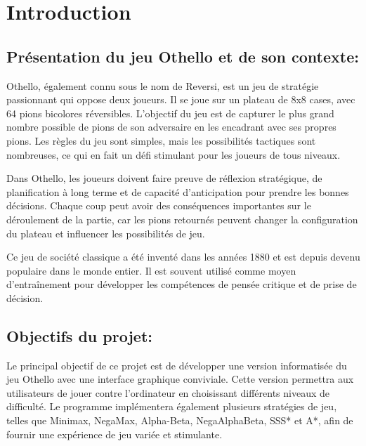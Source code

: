 \documentclass[12pt]{article}
\begin{document}
 
	\thispagestyle{empty}
	
	
	
	\newpage
	\tableofcontents
	\newpage
	\listoffigures
	\newpage
	\printglossary[title={Liste des Abbréviations}] %
	\newpage
	\section{Introduction}
	\subsection{Présentation du jeu Othello et de son contexte:}



Othello, également connu sous le nom de Reversi, est un jeu de stratégie passionnant qui oppose deux joueurs. Il se joue sur un plateau de 8x8 cases, avec 64 pions bicolores réversibles. L'objectif du jeu est de capturer le plus grand nombre possible de pions de son adversaire en les encadrant avec ses propres pions. Les règles du jeu sont simples, mais les possibilités tactiques sont nombreuses, ce qui en fait un défi stimulant pour les joueurs de tous niveaux.

Dans Othello, les joueurs doivent faire preuve de réflexion stratégique, de planification à long terme et de capacité d'anticipation pour prendre les bonnes décisions. Chaque coup peut avoir des conséquences importantes sur le déroulement de la partie, car les pions retournés peuvent changer la configuration du plateau et influencer les possibilités de jeu.

Ce jeu de société classique a été inventé dans les années 1880 et est depuis devenu populaire dans le monde entier. Il est souvent utilisé comme moyen d'entraînement pour développer les compétences de pensée critique et de prise de décision.

\subsection{Objectifs du projet:}

Le principal objectif de ce projet est de développer une version informatisée du jeu Othello avec une interface graphique conviviale. Cette version permettra aux utilisateurs de jouer contre l'ordinateur en choisissant différents niveaux de difficulté. Le programme implémentera également plusieurs stratégies de jeu, telles que Minimax, NegaMax, Alpha-Beta, NegaAlphaBeta, SSS* et A*, afin de fournir une expérience de jeu variée et stimulante.\\
\end{document}
